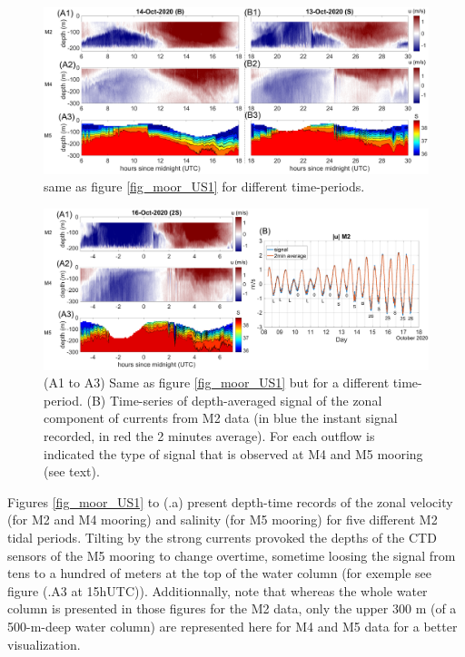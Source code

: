 \begin{figure}[!h]
 \includegraphics[width=\textwidth]{./GBR3D/US_moorings2.png}
 \caption {same as figure \ref{fig_moor_US1} for different time-periods.}
 \label{fig_moor_US2}
\end{figure}

\begin{figure}[!h]
 \includegraphics[width=\textwidth]{./GBR3D/US_moorings3.png}
 \caption {(A1 to A3) Same as figure \ref{fig_moor_US1} but for a different time-period. (B) Time-series of depth-averaged signal of the zonal component of currents from M2 data (in blue the instant signal recorded, in red the 2 minutes average). For each outflow is indicated the type of signal that is observed at M4 and M5 mooring (see text).}
 \label{fig_moor_US3}
\end{figure}

Figures \ref{fig_moor_US1} to (.a) present depth-time records of the zonal velocity (for M2 and M4 mooring) and salinity (for M5 mooring) for five different M2 tidal periods. Tilting by the strong currents provoked the depths of the CTD sensors of the M5 mooring to change overtime, sometime loosing the signal from tens to a hundred of meters at the top of the water column (for exemple see figure (.A3 at 15hUTC)). Additionnally, note that whereas the whole water column is presented in those figures for the M2 data, only the upper 300 m (of a 500-m-deep water column) are represented here for M4 and M5 data for a better visualization.

